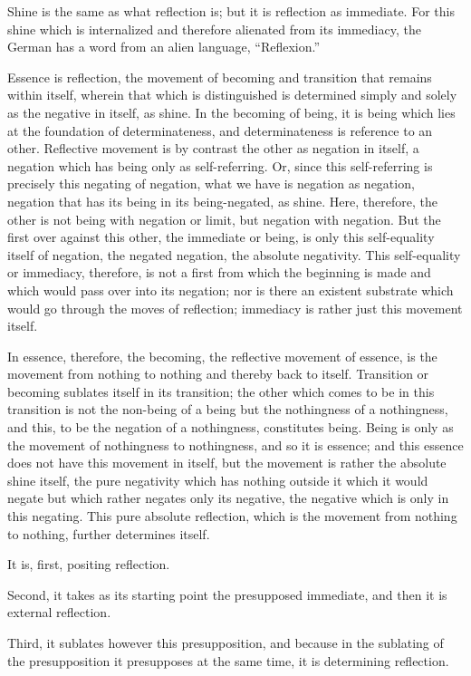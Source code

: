 Shine is the same as what reflection is;
but it is reflection as immediate.
For this shine which is internalized
and therefore alienated from its immediacy,
the German has a word from an alien language, “Reflexion.”

Essence is reflection, the movement of
becoming and transition that remains within itself,
wherein that which is distinguished is determined
simply and solely as the negative in itself, as shine.
In the becoming of being, it is being which lies
at the foundation of determinateness,
and determinateness is reference to an other.
Reflective movement is by contrast
the other as negation in itself,
a negation which has being only as self-referring.
Or, since this self-referring is precisely this negating of negation,
what we have is negation as negation,
negation that has its being in its being-negated, as shine.
Here, therefore, the other is not being with negation or limit,
but negation with negation.
But the first over against this other, the immediate or being,
is only this self-equality itself of negation,
the negated negation, the absolute negativity.
This self-equality or immediacy, therefore, is
not a first from which the beginning is made
and which would pass over into its negation;
nor is there an existent substrate which would
go through the moves of reflection;
immediacy is rather just this movement itself.

In essence, therefore, the becoming,
the reflective movement of essence,
is the movement from nothing to nothing
and thereby back to itself.
Transition or becoming sublates itself in its transition;
the other which comes to be in this transition is
not the non-being of a being but the nothingness of a nothingness,
and this, to be the negation of a nothingness, constitutes being.
Being is only as the movement of nothingness to nothingness,
and so it is essence;
and this essence does not have this movement in itself,
but the movement is rather the absolute shine itself,
the pure negativity which has nothing outside it
which it would negate but which rather negates only its negative,
the negative which is only in this negating.
This pure absolute reflection, which is the movement
from nothing to nothing, further determines itself.

It is, first, positing reflection.

Second, it takes as its starting point
the presupposed immediate,
and then it is external reflection.

Third, it sublates however this presupposition,
and because in the sublating of the presupposition
it presupposes at the same time,
it is determining reflection.


